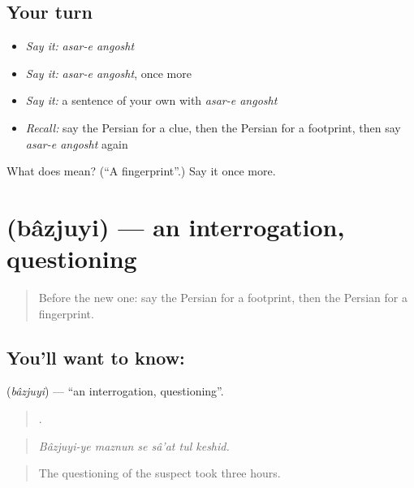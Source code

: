 \subsection*{Your turn}
\begin{itemize}
\raggedright
  \item \emph{Say it:} \emph{asar-e angosht}
  \item \emph{Say it:} \emph{asar-e angosht}, once more
  \item \emph{Say it:} a sentence of your own with \emph{asar-e angosht}
  \item \emph{Recall:} say the Persian for a clue, then the Persian for a footprint, then say \emph{asar-e angosht} again
\end{itemize}

\begin{tcolorbox}[breakable,colback=teal!4,colframe=teal!35!black,title={Before you move on}]
What does   mean? (\textquotedblleft{}A fingerprint\textquotedblright{}.) Say it once more.
\end{tcolorbox}
\section[\texorpdfstring{\fa{بازجویی} (bâzjuyi)}{بازجویی (bâzjuyi)}]{ (bâzjuyi) — an interrogation, questioning}

\label{lesson:FA-C320-bazjuyi}



\begin{quote}
Before the new one: say the Persian for a footprint, then the Persian for a fingerprint.
\end{quote}

\subsection*{You'll want to know: }
\textbf{} (\emph{bâzjuyi}) — \textquotedblleft{}an interrogation, questioning\textquotedblright{}.

\begin{quote}
     .
\end{quote}

\begin{quote}
\emph{Bâzjuyi-ye maznun se sâ'at tul keshid.}
\end{quote}

\begin{quote}
The questioning of the suspect took three hours.
\end{quote}

